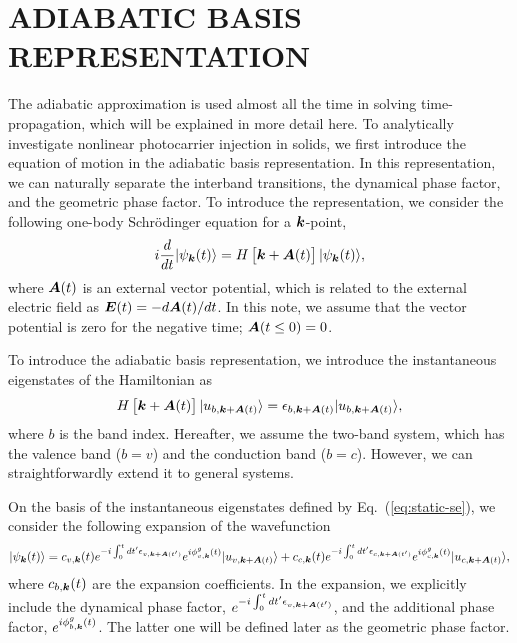 \chapter{ADIABATIC BASIS REPRESENTATION \label{ch:A_ADIABATIC}}
\label{ch:Adiabatic}
The adiabatic approximation is used almost all the time in solving time-propagation, which will be
explained in more detail here.
To analytically investigate nonlinear photocarrier injection in solids, we first introduce the equation of motion in the adiabatic basis representation. In this representation, we can naturally separate the interband transitions, the dynamical phase factor, and the geometric phase factor. To introduce the representation, we consider the following one-body Schr\"odinger equation for a $\boldsymbol k$-point,
\begin{equation}
	i \frac{d}{dt} | \psi_{\boldsymbol k}(t) \rangle = H \left [\boldsymbol k + \boldsymbol A(t) \right ] | \psi_{\boldsymbol k}(t) \rangle,
	\label{eqn:tdse00}
\end{equation}
where $\boldsymbol A(t)$ is an external vector potential, which is related to the external electric field as $\boldsymbol E(t)=-d\boldsymbol A(t)/dt$. In this note, we assume that the vector potential is zero for the negative time; $\boldsymbol A(t\leq 0)=0$.

To introduce the adiabatic basis representation, we introduce the instantaneous eigenstates of the Hamiltonian as
\begin{align}
	H\left [\boldsymbol k + \boldsymbol A(t) \right ] |u_{b,\boldsymbol k+\boldsymbol A(t)}\rangle = \epsilon_{b,\boldsymbol k + \boldsymbol A(t)}|u_{b,\boldsymbol k+\boldsymbol A(t)}\rangle,
	\label{eq:static-se}
\end{align}
where $b$ is the band index. Hereafter, we assume the two-band system, which has the valence band ($b=v$) and the conduction band ($b=c$). However, we can straightforwardly extend it to general systems.

On the basis of the instantaneous eigenstates defined by Eq.~(\ref{eq:static-se}), we consider the following expansion of the wavefunction
\begin{align}
	|\psi_{\boldsymbol k}(t)\rangle = c_{v,\boldsymbol k}(t) e^{-i\int^t_0dt' \epsilon_{v,\boldsymbol k+ \boldsymbol A(t')}} e^{i\phi^g_{v,\boldsymbol k}(t)} |u_{v,\boldsymbol k+\boldsymbol A(t)}\rangle
	+c_{c,\boldsymbol k}(t) e^{-i\int^t_0dt' \epsilon_{c,\boldsymbol k+ \boldsymbol A(t')}} e^{i\phi^g_{c,\boldsymbol k}(t)} |u_{c,\boldsymbol k+\boldsymbol A(t)}\rangle,
	\label{eq:ansatz}
\end{align}
where $c_{b,\boldsymbol k}(t)$ are the expansion coefficients. In the expansion, we explicitly include the dynamical phase factor, $e^{-i\int^t_0dt' \epsilon_{v,\boldsymbol k+ \boldsymbol A(t')}}$, and the additional phase factor, $e^{i\phi^g_{b,\boldsymbol k}(t)}$. The latter one will be defined later as the geometric phase factor.

